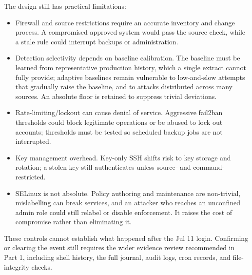 The design still has practical limitations:
\begin{itemize}
    \item Firewall and source restrictions require an accurate inventory and change process. A compromised approved system would pass the source check, while a stale rule could interrupt backups or administration.
    \item Detection selectivity depends on baseline calibration. The baseline must be learned from representative production history, which a single extract cannot fully provide; adaptive baselines remain vulnerable to low-and-slow attempts that gradually raise the baseline, and to attacks distributed across many sources. An absolute floor is retained to suppress trivial deviations.
    \item Rate-limiting/lockout can cause denial of service. Aggressive fail2ban thresholds could block legitimate operations or be abused to lock out accounts; thresholds must be tested so scheduled backup jobs are not interrupted.
    \item Key management overhead. Key-only SSH shifts risk to key storage and rotation; a stolen key still authenticates unless source- and command-restricted.
    \item SELinux is not absolute. Policy authoring and maintenance are non-trivial, mislabelling can break services, and an attacker who reaches an unconfined admin role could still relabel or disable enforcement. It raises the cost of compromise rather than eliminating it.
\end{itemize}

These controls cannot establish what happened after the Jul 11 login. Confirming or clearing the event still requires the wider evidence review recommended in Part 1, including shell history, the full journal, audit logs, cron records, and file-integrity checks.
